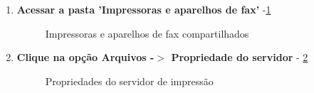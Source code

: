 \begin{enumerate}
	\item \textbf{Acessar a pasta 'Impressoras e aparelhos de fax'} -\ref{impressora_aparelho_fax}
	\begin{figure}[ht]
	   	\centering
	   	\caption{Impressoras e aparelhos de fax compartilhados}
	    \label{impressora_aparelho_fax}
	\end{figure}
	
	\item \textbf{Clique na opção Arquivos -$>$ Propriedade do servidor} - \ref{propriedade_servidor}
	\begin{figure}[ht]
	   	\centering
	   	\caption{Propriedades do servidor de impressão}
	    \label{propriedade_servidor}
	\end{figure}
	

\end{enumerate}
